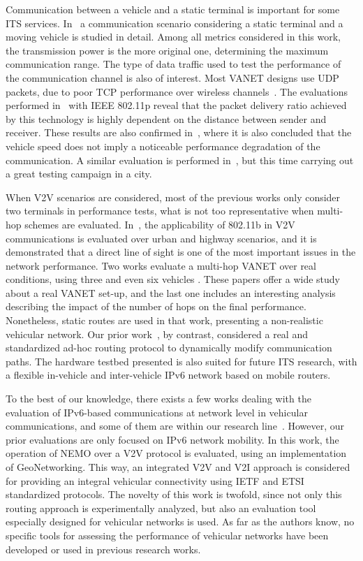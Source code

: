 \documentclass[fonts]{icst}
\begin{document}
Communication between a vehicle and a static terminal is important for some
ITS services. In~\cite{Wewetzer2007} a communication scenario considering a
static terminal and a moving vehicle is studied in detail. Among all metrics
considered in this work, the transmission power is the more original one,
determining the maximum communication range. The type of data traffic used to
test the performance of the communication channel is also of interest. Most
VANET designs use UDP packets, due to poor TCP performance over wireless
channels~\cite{Hui05, festag4fbc}. The evaluations performed in~\cite{shagdar:hal-00702923} with IEEE 802.11p  reveal that the packet delivery ratio achieved by this technology is highly dependent on the distance between sender and receiver. These results are also confirmed in~\cite{Lin12}, where it is also concluded that the vehicle speed does not imply a noticeable performance degradation of the communication. A similar evaluation is performed in~\cite{Gozalvez12}, but this time carrying out a great testing campaign in a city. 
 


When V2V scenarios are considered, most of the previous works only consider two terminals in performance tests, what is not too representative when multi-hop schemes are evaluated. In~\cite{1390578}, the applicability of 802.11b in V2V communications is evaluated over urban and highway scenarios, and it is
demonstrated that a direct line of sight is one of the most important issues in the network performance.
Two works evaluate a multi-hop VANET over real conditions, using three \cite{Jerbi2007c} and even six vehicles
\cite{Jerbi2008}. These papers offer a wide study about a real VANET set-up, and
the last one includes an interesting analysis describing the impact of the
number of hops on the final performance.
Nonetheless, static routes are used in that work, presenting a non-realistic vehicular network. Our prior work~\cite{Tsukada2010a}, by contrast, considered a real and standardized ad-hoc routing protocol to dynamically modify communication paths. The hardware testbed presented is also suited for future ITS research, with a flexible in-vehicle and inter-vehicle IPv6 network based on mobile routers.

To the best of our knowledge, there exists a few works dealing with the evaluation of IPv6-based communications at network level in vehicular communications, and some of them are within our research line~\cite{Santa13b,Santa13a}. However, our prior evaluations are only focused on IPv6 network mobility. In this work, the operation of NEMO over a V2V protocol is evaluated, using an implementation of GeoNetworking. This way, an integrated V2V and V2I approach is considered for providing an integral vehicular connectivity using IETF and ETSI standardized protocols. The novelty of this work is twofold, since not only this routing approach is experimentally analyzed, but also an evaluation tool especially designed for vehicular networks is used. As far as the authors know, no specific tools for assessing the performance of vehicular networks have been developed or used in previous research works.
\end{document}
